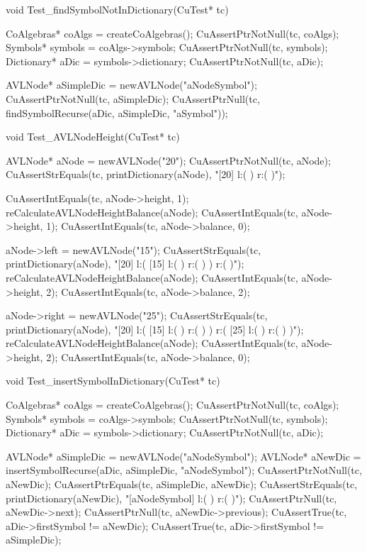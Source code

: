 void Test_findSymbolNotInDictionary(CuTest* tc) {
  CoAlgebras* coAlgs = createCoAlgebras();
  CuAssertPtrNotNull(tc, coAlgs);
  Symbols* symbols = coAlgs->symbols;
  CuAssertPtrNotNull(tc, symbols);
  Dictionary* aDic = symbols->dictionary;
  CuAssertPtrNotNull(tc, aDic);

  AVLNode* aSimpleDic = newAVLNode("aNodeSymbol");
  CuAssertPtrNotNull(tc, aSimpleDic);
  CuAssertPtrNull(tc, findSymbolRecurse(aDic, aSimpleDic, "aSymbol"));
}

void Test_AVLNodeHeight(CuTest* tc) {
  AVLNode* aNode = newAVLNode("20");
  CuAssertPtrNotNull(tc, aNode);
  CuAssertStrEquals(tc, printDictionary(aNode),
  "[20] l:(  ) r:(  )");

  CuAssertIntEquals(tc, aNode->height, 1);
  reCalculateAVLNodeHeightBalance(aNode);
  CuAssertIntEquals(tc, aNode->height, 1);
  CuAssertIntEquals(tc, aNode->balance, 0);

  aNode->left = newAVLNode("15");
  CuAssertStrEquals(tc, printDictionary(aNode),
  "[20] l:( [15] l:(  ) r:(  )  ) r:(  )");
  reCalculateAVLNodeHeightBalance(aNode);
  CuAssertIntEquals(tc, aNode->height, 2);
  CuAssertIntEquals(tc, aNode->balance, 2);

  aNode->right = newAVLNode("25");
  CuAssertStrEquals(tc, printDictionary(aNode),
  "[20] l:( [15] l:(  ) r:(  )  ) r:( [25] l:(  ) r:(  )  )");
  reCalculateAVLNodeHeightBalance(aNode);
  CuAssertIntEquals(tc, aNode->height, 2);
  CuAssertIntEquals(tc, aNode->balance, 0);
}

void Test_insertSymbolInDictionary(CuTest* tc) {
  CoAlgebras* coAlgs = createCoAlgebras();
  CuAssertPtrNotNull(tc, coAlgs);
  Symbols* symbols = coAlgs->symbols;
  CuAssertPtrNotNull(tc, symbols);
  Dictionary* aDic = symbols->dictionary;
  CuAssertPtrNotNull(tc, aDic);

  AVLNode* aSimpleDic = newAVLNode("aNodeSymbol");
  AVLNode* aNewDic = insertSymbolRecurse(aDic, aSimpleDic, "aNodeSymbol");
  CuAssertPtrNotNull(tc, aNewDic);
  CuAssertPtrEquals(tc, aSimpleDic, aNewDic);
  CuAssertStrEquals(tc, printDictionary(aNewDic),
  "[aNodeSymbol] l:(  ) r:(  )");
  CuAssertPtrNull(tc, aNewDic->next);
  CuAssertPtrNull(tc, aNewDic->previous);
  CuAssertTrue(tc, aDic->firstSymbol != aNewDic);
  CuAssertTrue(tc, aDic->firstSymbol != aSimpleDic);
}

